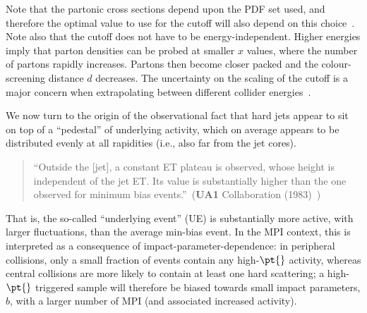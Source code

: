 Note that  the partonic cross sections depend upon the PDF set used,
and therefore the optimal value to use for the 
cutoff will also depend on this
choice~\cite{Schulz:2011qy}. Note also that 
the cutoff does not have to be energy-independent. 
Higher energies imply that parton densities can be probed at smaller
$x$ values, where the number of partons rapidly increases. Partons
then become closer packed and the colour-screening distance $d$
decreases. The uncertainty on the scaling of the cutoff is a major concern when
extrapolating between different collider 
energies~\cite{Skands:2010ak,Schulz:2011qy,Skands:2013asa}. 

We now turn to the origin of the observational fact that hard jets appear to sit on top of a ``pedestal'' of underlying activity, which on average appears to be distributed evenly at all rapidities (i.e., also far from the jet cores). 
\begin{quote}
  ``Outside the [jet], a constant ET plateau is observed, whose height is independent of the jet ET. Its value is substantially higher than the one observed for minimum bias events.''~(\textbf{UA1} Collaboration (1983)~\cite{Arnison:1983gw})
\end{quote}
That is, the so-called ``underlying event'' (UE) is 
substantially more active, with larger fluctuations, than the average min-bias
event. In the MPI context, this is interpreted as a consequence of
impact-parameter-dependence: in peripheral
collisions, only a small fraction of events contain any
high-$\pt{}$ activity, whereas central collisions are more
likely to contain at least one hard scattering; a high-$\pt{}$ triggered
sample will therefore be biased towards small impact parameters, $b$,
with a larger number of MPI (and associated increased activity).

